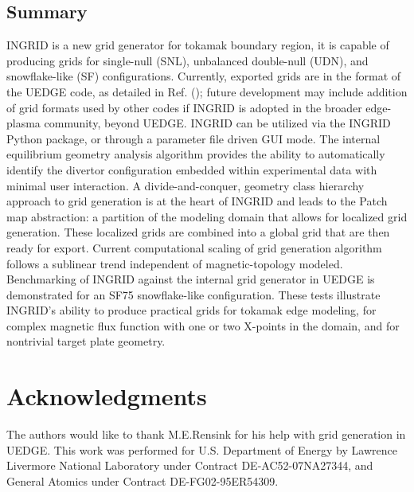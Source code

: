 \subsection{\label{sec:level2}Summary}
INGRID is a new grid generator for tokamak boundary region, it is
capable of producing grids for single-null (SNL), unbalanced
double-null (UDN), and snowflake-like (SF) configurations. Currently,
exported grids are in the format of the UEDGE code, as detailed in
Ref. (\cite{Rensink2017}); future development may include addition of
grid formats used by other codes if INGRID is adopted in the broader
edge-plasma community, beyond UEDGE. INGRID can be utilized via the
INGRID Python package, or through a parameter file driven GUI
mode. The internal equilibrium geometry analysis algorithm provides
the ability to automatically identify the divertor configuration
embedded within experimental data with minimal user interaction. A
divide-and-conquer, geometry class hierarchy approach to grid
generation is at the heart of INGRID and leads to the Patch map
abstraction: a partition of the modeling domain that allows for
localized grid generation. These localized grids are combined into a
global grid that are then ready for export. Current computational
scaling of grid generation algorithm follows a sublinear trend
independent of magnetic-topology modeled. Benchmarking of INGRID
against the internal grid generator in UEDGE is demonstrated for an
SF75 snowflake-like configuration. These tests illustrate INGRID's
ability to produce practical grids for tokamak edge modeling, for
complex magnetic flux function with one or two X-points in the domain,
and for nontrivial target plate geometry.


\section{Acknowledgments}
The authors would like to thank M.E.Rensink for his help with grid
generation in UEDGE. This work was performed for U.S. Department of
Energy by Lawrence Livermore National Laboratory under Contract
DE-AC52-07NA27344, and General Atomics under Contract DE-FG02-95ER54309.
